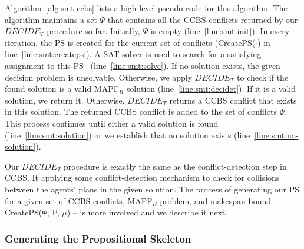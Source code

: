 \documentclass[review]{elsarticle}
\newcommand{\implicitct}{\textit{ImplicitCT}\xspace}
\newcommand{\decidet}{\ensuremath{\mathit{DECIDE_T}}\xspace}
\newcommand{\ccbs}{\ac{CCBS}\xspace}
\newcommand{\ct}{\ac{CT}\xspace}
\newcommand{\ps}{\ac{PS}\xspace}
\newcommand{\mapfr}{\ac{MAPF}$_R$\xspace}
\newcommand{\mapf}{\ac{MAPF}\xspace}
\begin{document}
Algorithm~\ref{alg:smt-ccbs} lists a high-level pseudo-code for this algorithm. 
The algorithm maintains a set $\Psi$ that contains all the \ccbs conflicts returned by our \decidet procedure so far. 
Initially, $\Psi$ is empty (line~\ref{line:smt:init}). 
In every iteration, the \ps is created for the current set of conflicts (CreatePS($\cdot$) in line~\ref{line:smt:createps}). 
A SAT solver is used to search for a satisfying assignment to this \ps~ (line~\ref{line:smt:solve}). 
If no solution exists, the given decision problem is unsolvable. 
Otherwise, we apply \decidet to check if the found solution is a valid \mapfr solution (line~\ref{line:smt:decidet}). 
If it is a valid solution, we return it.
Otherwise, \decidet returns a \ccbs conflict that exists in this solution. 
The returned \ccbs conflict is added to the set of conflicts $\Psi$. 
This process continues until either a valid solution is found (line~\ref{line:smt:solution}) or we establish that no solution exists (line~\ref{line:smt:no-solution}).



Our \decidet procedure is exactly the same as the conflict-detection step in \ccbs. 
It applying some conflict-detection mechanism to check for collisions between the agents' plans in the given solution. 
The process of generating our \ps for a given set of \ccbs conflicts, \mapfr problem, and makespan bound -- CreatePS($\Psi$, P, $\mu$) -- is more involved and we describe it next. 







\subsubsection{Generating the Propositional Skeleton}
\label{sec:propositional-skeleton}





\end{document}
